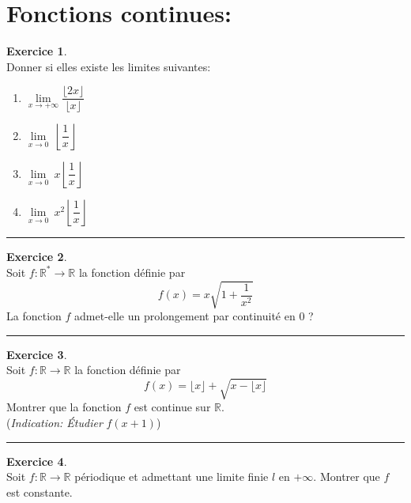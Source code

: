\documentclass[a4paper,10pt]{article}
\theoremstyle{definition}
\theoremstyle{definition}
\newtheorem{exo}{Exercice}
\newcommand{\R}{\mathbb{R}}
\begin{document}
\section*{Fonctions continues:}
\begin{minipage}{1\linewidth}
\begin{minipage}[t]{0.48\linewidth}
\raggedright

\begin{exo}\quad\\
Donner si elles existe les limites suivantes:
\begin{multicols}{2}
\begin{enumerate}
\item $\lim\limits_{x\rightarrow+\infty} \dfrac{\lfloor 2x\rfloor}{\lfloor x\rfloor}$
\item $\lim\limits_{x\rightarrow 0}~ \left\lfloor\dfrac{ 1}{ x} \right\rfloor$
\item $\lim\limits_{x\rightarrow 0} ~x\left\lfloor\dfrac{ 1}{ x} \right\rfloor$
\item$\lim\limits_{x\rightarrow 0} ~x^2\left\lfloor\dfrac{ 1}{ x} \right\rfloor$
\end{enumerate}
\end{multicols}
\centering\rule{1\linewidth}{0.6pt}
\end{exo}

\begin{exo}\quad\\
Soit $f: \R^*\rightarrow\R$ la fonction définie par $$f(x) = x\sqrt{1+\dfrac{1}{x^2}}$$
La fonction $f$ admet-elle un prolongement par continuité en $0$ ? 

\centering
\rule{1\linewidth}{0.6pt}
\end{exo}

\begin{exo}\quad\\
Soit $f: \R\rightarrow\R$ la fonction définie par $$f(x) =\lfloor x\rfloor + \sqrt{x - \lfloor x\rfloor }$$
Montrer que la fonction $f$ est continue sur $\R$.\\
(\textit{Indication: Étudier }$f(x+1)$)

\centering
\rule{1\linewidth}{0.6pt}
\end{exo}

\end{minipage}	
\hfill\vrule\hfill
\begin{minipage}[t]{0.48\linewidth}
\raggedright


\begin{exo}\quad\\
Soit $f: \R\rightarrow\R$ périodique et admettant une limite finie $l$ en $+\infty$. Montrer que $f$ est constante.


\end{exo}
\end{minipage}
\end{minipage}
\end{document}
